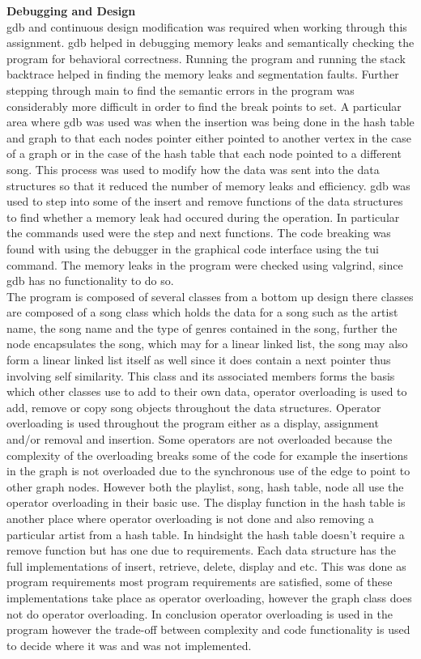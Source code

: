 \documentclass[a4paper,10pt]{article}
\newcommand{\homeworkProblemName}{}
\begin{document}
\homeworkProblemName{\large \bfseries Debugging and Design} \\
gdb and continuous design modification was required when working through this assignment. gdb helped in debugging memory leaks and semantically checking the program for behavioral correctness. Running the program and running the stack backtrace helped in finding the memory leaks and segmentation faults. Further stepping through main to find the semantic errors in the program was considerably more difficult in order to find the break points to set. A particular area where gdb was used was when the insertion was being done in the hash table and graph to that each nodes pointer either pointed to another vertex in the case of a graph or in the case of the hash table that each node pointed to a different song. This process was used to modify how the data was sent into the data structures so that it reduced the number of memory leaks and efficiency. gdb was used to step into some of the insert and remove functions of the data structures to find whether a memory leak had occured during the operation. In particular the commands used were the step and next functions. The code breaking was found with using the debugger in the graphical code interface using the tui command. The memory leaks in the program were checked using valgrind, since gdb has no functionality to do so. \\

The program is composed of several classes from a bottom up design there classes are composed of a song class which holds the data for a song such as the artist name, the song name and the type of genres contained in the song, further the node encapsulates the song, which may for a linear linked list, the song may also form a linear linked list itself as well since it does contain a next pointer thus involving self similarity.  This class and its associated members forms the basis which other classes use to add to their own data, operator overloading is used to add, remove or copy song objects throughout the data structures. Operator overloading is used throughout the program either as a display, assignment and/or removal and insertion. Some operators are not overloaded because the complexity of the overloading breaks some of the code for example the insertions in the graph is not overloaded due to the synchronous use of the edge to point to other graph nodes. However both the playlist, song, hash table, node all use the operator overloading in their basic use. The display function in the hash table is another place where operator overloading is not done and also removing a particular artist from a hash table. In hindsight the hash table doesn't require a remove function but has one due to requirements. Each data structure has the full implementations of insert, retrieve, delete, display and etc. This was done as program requirements most program requirements are satisfied, some of these implementations take place as operator overloading, however the graph class does not do operator overloading. In conclusion operator overloading is used in the program however the trade-off between complexity and code functionality is used to decide where it was and was not implemented.  
\end{document}
